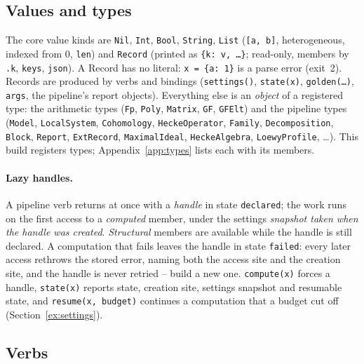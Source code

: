 \documentclass[11pt,openany]{report}
\newcommand{\vb}[1]{\texttt{#1}}
\begin{document}
\subsection{Values and types}\label{sec:types}

The core value kinds are \vb{Nil}, \vb{Int}, \vb{Bool}, \vb{String}, \vb{List} (\texttt{[a, b]},
heterogeneous, indexed from 0, \vb{len}) and \vb{Record} (printed as \texttt{\{k: v, \dots\}}; read-only, members by
\texttt{.k}, \vb{keys}, \vb{json}). A Record has no literal: \texttt{x = \{a: 1\}} is a parse error
(exit~2). Records are produced by verbs and bindings (\vb{settings()}, \vb{state(x)}, \vb{golden(\dots)}, \vb{args}, the
pipeline's report objects). Everything else is an \emph{object} of a registered type: the
arithmetic types (\vb{Fp}, \vb{Poly}, \vb{Matrix}, \vb{GF}, \vb{GFElt}) and the pipeline types
(\vb{Model}, \vb{LocalSystem}, \vb{Cohomology}, \vb{HeckeOperator}, \vb{Family}, \vb{Decomposition},
\vb{Block}, \vb{Report}, \vb{ExtRecord}, \vb{MaximalIdeal}, \vb{HeckeAlgebra}, \vb{LoewyProfile},
\dots). This build registers \CMNumTypes{} types; Appendix~\ref{app:types} lists each with its members.

\paragraph{Lazy handles.} A pipeline verb returns at once with a \emph{handle} in state
\texttt{declared}; the work runs on the first access to a \emph{computed} member, under the settings
\emph{snapshot taken when the handle was created}. \emph{Structural} members are available while the
handle is still declared. A computation that fails leaves the handle in state \texttt{failed}: every later
access rethrows the stored error, naming both the access site and the creation site, and the handle is
never retried -- build a new one. \vb{compute(x)} forces a handle, \vb{state(x)} reports state, creation
site, settings snapshot and resumable state, and \vb{resume(x, budget)} continues a computation that a
budget cut off (Section~\ref{ex:settings}).

\subsection{Verbs}
\end{document}
